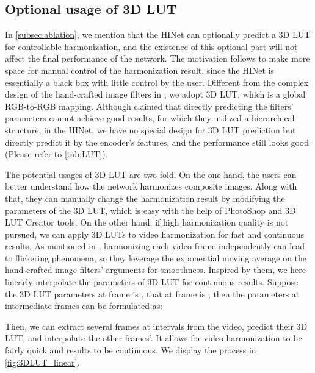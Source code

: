 \documentclass[10pt,journal,twocolumn,twoside]{IEEEtran}
\begin{document}
\subsection{Optional usage of 3D LUT}
\label{subsec: application 3d}
In \cref{subsec:ablation}, we mention that the HINet can optionally predict a 3D LUT for controllable harmonization, and the existence of this optional part will not affect the final performance of the network. The motivation follows \cite{xue2022dccf, ke2022harmonizer} to make more space for manual control of the harmonization result, since the HINet is essentially a black box with little control by the user. Different from the complex design of the hand-crafted image filters in \cite{xue2022dccf, ke2022harmonizer}, we adopt 3D LUT, which is a global RGB-to-RGB mapping. Although \cite{ke2022harmonizer} claimed that directly predicting the filters' parameters cannot achieve good results, for which they utilized a hierarchical structure, in the HINet, we have no special design for 3D LUT prediction but directly predict it by the encoder's features, and the performance still looks good (Please refer to \cref{tab:LUT}).

The potential usages of 3D LUT are two-fold. On the one hand, the users can better understand how the network harmonizes composite images. Along with that, they can manually change the harmonization result by modifying the parameters of the 3D LUT, which is easy with the help of PhotoShop and 3D LUT Creator tools. On the other hand, if high harmonization quality is not pursued, we can apply 3D LUTs to video harmonization for fast and continuous results. As mentioned in \cite{ke2022harmonizer}, harmonizing each video frame independently can lead to flickering phenomena, so they leverage the exponential moving average on the hand-crafted image filters' arguments for smoothness. Inspired by them, we here linearly interpolate the parameters of 3D LUT for continuous results. Suppose the 3D LUT parameters at  frame is , that at  frame is , then the parameters at intermediate frames  can be formulated as:

Then, we can extract several frames at intervals from the video, predict their 3D LUT, and interpolate the other frames'. It allows for video harmonization to be fairly quick and results to be continuous. We display the process in \cref{fig:3DLUT_linear}.
\end{document}
